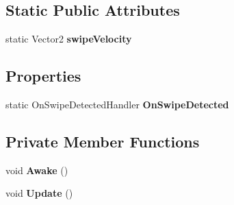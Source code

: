 \subsection*{Static Public Attributes}
\begin{DoxyCompactItemize}
\item 
\mbox{\label{class_swipe_manager_a4682860346ce2fc8bfa16b46e35fc81c}} 
static Vector2 {\bfseries swipe\+Velocity}
\end{DoxyCompactItemize}
\subsection*{Properties}
\begin{DoxyCompactItemize}
\item 
\mbox{\label{class_swipe_manager_aa84559b4367c9364679763b89ac08d6d}} 
static On\+Swipe\+Detected\+Handler {\bfseries On\+Swipe\+Detected}
\end{DoxyCompactItemize}
\subsection*{Private Member Functions}
\begin{DoxyCompactItemize}
\item 
\mbox{\label{class_swipe_manager_a3445c1c974b355439267328664d47ae0}} 
void {\bfseries Awake} ()
\item 
\mbox{\label{class_swipe_manager_ae1e01d1b0c66ccf4e8fe6b1c84210739}} 
void {\bfseries Update} ()
\end{DoxyCompactItemize}
